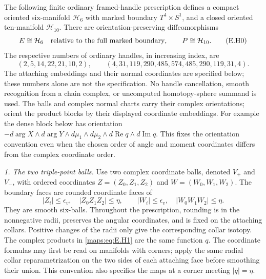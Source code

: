 \begin{theorem}\label{maps:src:E.2.21}


The following finite ordinary framed-handle prescription defines a
compact oriented six-manifold $\mathcal H_6$ with marked boundary
$T^4\times S^1$, and a closed oriented ten-manifold $\mathcal H_{10}$.
There are orientation-preserving diffeomorphisms
\[
 E\cong\mathcal H_6\quad\hbox{relative to the full marked boundary},
 \qquad P\cong\mathcal H_{10}.
 \tag{E.H0}\label{maps:eq:E.H0}
\]
The respective numbers of ordinary handles, in increasing index, are
\[
 (2,5,14,22,21,10,2),\qquad
 (4,31,119,290,485,574,485,290,119,31,4).
\]
The attaching embeddings and their normal coordinates are specified
below; these numbers alone are not the specification.  No handle
cancellation, smooth recognition from a chain complex, or uncomputed
homotopy-sphere summand is used.
The balls and complex normal charts carry their complex orientations;
orient the product blocks by their displayed coordinate embeddings.
For example the dense block below has orientation
$-d\arg X\wedge d\arg Y\wedge d\mu_1\wedge d\mu_2
\wedge d\operatorname{Re}q\wedge d\operatorname{Im}q$.
This fixes the orientation convention even when the chosen order of
angle and moment coordinates differs from the complex coordinate order.

\emph{1. The two triple-point balls.}
Use two complex coordinate balls, denoted $V_+$ and $V_-$, with
ordered coordinates $Z=(Z_0,Z_1,Z_2)$ and $W=(W_0,W_1,W_2)$.
The boundary faces are rounded coordinate faces of
\[
 |Z_i|\leq\epsilon_v,\quad |Z_0Z_1Z_2|\leq\eta,
 \qquad
 |W_i|\leq\epsilon_v,\quad |W_0W_1W_2|\leq\eta.
 \tag{E.H1}\label{maps:eq:E.H1}
\]
They are smooth six-balls.  Throughout the prescription, rounding is
in the nonnegative radii, preserves the angular coordinates, and is
fixed on the attaching collars.  Positive changes of the radii only
give the corresponding collar isotopy.  The complex products in
\eqref{maps:eq:E.H1} are the same function $q$.
The coordinate formulas may first be read on manifolds with corners;
apply the same radial collar reparametrization on the two sides of
each attaching face before smoothing their union.  This convention
also specifies the maps at a corner meeting $|q|=\eta$.


\end{theorem}
